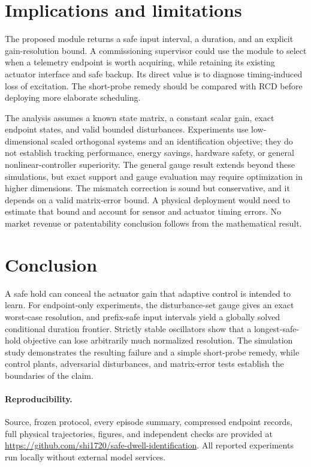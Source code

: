 \documentclass{l4dc2026}
\begin{document}
\section{Implications and limitations}
The proposed module returns a safe input interval, a duration, and an explicit gain-resolution bound. A commissioning supervisor could use the module to select when a telemetry endpoint is worth acquiring, while retaining its existing actuator interface and safe backup. Its direct value is to diagnose timing-induced loss of excitation. The short-probe remedy should be compared with RCD before deploying more elaborate scheduling.

The analysis assumes a known state matrix, a constant scalar gain, exact endpoint states, and valid bounded disturbances. Experiments use low-dimensional scaled orthogonal systems and an identification objective; they do not establish tracking performance, energy savings, hardware safety, or general nonlinear-controller superiority. The general gauge result extends beyond these simulations, but exact support and gauge evaluation may require optimization in higher dimensions. The mismatch correction is sound but conservative, and it depends on a valid matrix-error bound. A physical deployment would need to estimate that bound and account for sensor and actuator timing errors. No market revenue or patentability conclusion follows from the mathematical result.

\section{Conclusion}
A safe hold can conceal the actuator gain that adaptive control is intended to learn. For endpoint-only experiments, the disturbance-set gauge gives an exact worst-case resolution, and prefix-safe input intervals yield a globally solved conditional duration frontier. Strictly stable oscillators show that a longest-safe-hold objective can lose arbitrarily much normalized resolution. The simulation study demonstrates the resulting failure and a simple short-probe remedy, while control plants, adversarial disturbances, and matrix-error tests establish the boundaries of the claim.

\paragraph{Reproducibility.}
Source, frozen protocol, every episode summary, compressed endpoint records, full physical trajectories, figures, and independent checks are provided at \url{https://github.com/shi1720/safe-dwell-identification}. All reported experiments run locally without external model services.
\end{document}
